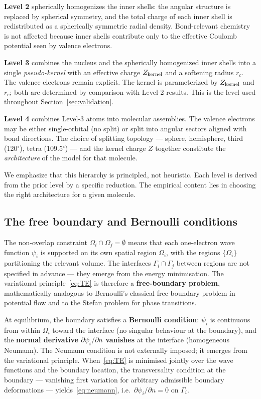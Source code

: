 \documentclass[11pt]{article}
\begin{document}
\textbf{Level 2} spherically homogenizes the inner shells: the angular structure is replaced by spherical symmetry, and the total charge of each inner shell is redistributed as a spherically symmetric radial density. Bond-relevant chemistry is not affected because inner shells contribute only to the effective Coulomb potential seen by valence electrons.

\textbf{Level 3} combines the nucleus and the spherically homogenized inner shells into a single \emph{pseudo-kernel} with an effective charge $Z_{\rm kernel}$ and a softening radius $r_c$. The valence electrons remain explicit. The kernel is parameterized by $Z_{\rm kernel}$ and $r_c$; both are determined by comparison with Level-2 results. This is the level used throughout Section~\ref{sec:validation}.

\textbf{Level 4} combines Level-3 atoms into molecular assemblies. The valence electrons may be either single-orbital (no split) or split into angular sectors aligned with bond directions. The choice of splitting topology --- sphere, hemisphere, third (120$^\circ$), tetra (109.5$^\circ$) --- and the kernel charge $Z$ together constitute the \emph{architecture} of the model for that molecule.

We emphasize that this hierarchy is principled, not heuristic. Each level is derived from the prior level by a specific reduction. The empirical content lies in choosing the right architecture for a given molecule.

\subsection{The free boundary and Bernoulli conditions}\label{sec:bernoulli}

The non-overlap constraint $\Omega_i \cap \Omega_j = \emptyset$ means that each one-electron wave function $\psi_i$ is supported on its own spatial region $\Omega_i$, with the regions $\{\Omega_i\}$ partitioning the relevant volume. The interfaces $\Gamma_i \cap \Gamma_j$ between regions are not specified in advance --- they emerge from the energy minimisation. The variational principle~\eqref{eq:TE} is therefore a \textbf{free-boundary problem}, mathematically analogous to Bernoulli's classical free-boundary problem in potential flow and to the Stefan problem for phase transitions.

At equilibrium, the boundary satisfies a \textbf{Bernoulli condition}: $\psi_i$ is continuous from within $\Omega_i$ toward the interface (no singular behaviour at the boundary), and the \textbf{normal derivative $\partial \psi_i / \partial n$ vanishes} at the interface (homogeneous Neumann). The Neumann condition is not externally imposed; it emerges from the variational principle. When~\eqref{eq:TE} is minimised jointly over the wave functions and the boundary location, the transversality condition at the boundary --- vanishing first variation for arbitrary admissible boundary deformations --- yields~\eqref{eq:neumann}, i.e.\ $\partial \psi_i / \partial n = 0$ on $\Gamma_i$.
\end{document}
